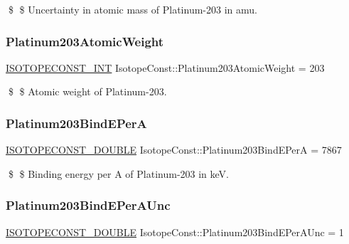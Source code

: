 \$ \$ Uncertainty in atomic mass of Platinum-\/203 in amu. \mbox{\label{group___isotope_const-_platinum-_pt203_ga9b0661300790087ea2562b7841c45aed}} 
\subsubsection{\texorpdfstring{Platinum203\+Atomic\+Weight}{Platinum203AtomicWeight}}
{\footnotesize\ttfamily \mbox{\hyperlink{group___isotope_const-_macros_ga5f18360b3e99483a35c32d789e62621c}{I\+S\+O\+T\+O\+P\+E\+C\+O\+N\+S\+T\+\_\+\+I\+NT}} Isotope\+Const\+::\+Platinum203\+Atomic\+Weight = 203}

\$ \$ Atomic weight of Platinum-\/203. \mbox{\label{group___isotope_const-_platinum-_pt203_ga3193650b809dea3aa839fd208190160a}} 
\subsubsection{\texorpdfstring{Platinum203\+Bind\+E\+PerA}{Platinum203BindEPerA}}
{\footnotesize\ttfamily \mbox{\hyperlink{group___isotope_const-_macros_ga8f45a7272ce02c0b4c65c44636ed719a}{I\+S\+O\+T\+O\+P\+E\+C\+O\+N\+S\+T\+\_\+\+D\+O\+U\+B\+LE}} Isotope\+Const\+::\+Platinum203\+Bind\+E\+PerA = 7867}

\$ \$ Binding energy per A of Platinum-\/203 in keV. \mbox{\label{group___isotope_const-_platinum-_pt203_gaa86ede3a03034a5578d50eb65cfb74e6}} 
\subsubsection{\texorpdfstring{Platinum203\+Bind\+E\+Per\+A\+Unc}{Platinum203BindEPerAUnc}}
{\footnotesize\ttfamily \mbox{\hyperlink{group___isotope_const-_macros_ga8f45a7272ce02c0b4c65c44636ed719a}{I\+S\+O\+T\+O\+P\+E\+C\+O\+N\+S\+T\+\_\+\+D\+O\+U\+B\+LE}} Isotope\+Const\+::\+Platinum203\+Bind\+E\+Per\+A\+Unc = 1}

